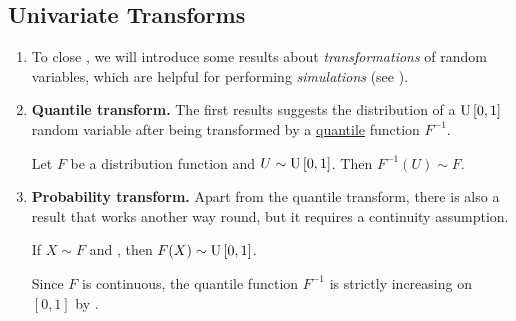 \subsection{Univariate Transforms}
\begin{enumerate}
\item To close , we will introduce some results about
\emph{transformations} of random variables, which are helpful for
performing \emph{simulations} (see ).
\item \textbf{Quantile transform.} The first results suggests the distribution
of a \(\operatorname{U}\left[0,1\right]\) random variable after being transformed by a
\underline{quantile} function \(F^{-1}\).

\begin{proposition}
\label{prp:quantile-trans}
Let \(F\) be a distribution function and \(U\sim\operatorname{U}\left[0,1\right]\). Then
\(F^{-1}(U)\sim F\).
\end{proposition}
\item \textbf{Probability transform.} Apart from the quantile transform, there
is also a result that works another way round, but it requires a continuity
assumption.

\begin{proposition}
\label{prp:prob-trans}
If \(X\sim F\) and , then \(F(X)\sim \operatorname{U}\left[0,1\right]\).
\end{proposition}
\begin{pf}
Since \(F\) is continuous, the quantile function \(F^{-1}\) is strictly
increasing on \([0,1]\) by .
\end{pf}
\end{enumerate}
